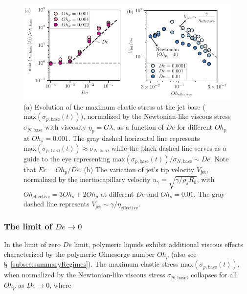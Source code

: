 \documentclass{jfm}
\newcommand{\oo}{\color{magenta} \normalfont}
\newcommand{\bb}{\color{black} \normalfont}
\begin{document}
\begin{figure}
	\centering
	\includegraphics[width=\textwidth]{Figures/Stress_De-r/Stress_De-r_05-eps-converted-to.pdf}
	\caption{(a) Evolution of the maximum elastic stress at the jet base ($\text{max}\left(\sigma_{p,\text{base}}(t)\right)$), normalized by the Newtonian-like viscous stress $\sigma_{N,\text{base}}$ with viscosity $\eta_{p} = G\lambda$, as a function of $De$ for different $Oh_p$ at $Oh_s = 0.001$. The gray dashed horizontal line represents $\text{max}\left(\sigma_{p,\text{base}}(t)\right) \approx \sigma_{N,\text{base}}$ while the black dashed line serves as a guide to the eye representing $\text{max}\left(\sigma_{p,\text{base}}(t)\right)/\sigma_{N,\text{base}} \sim De$. {\oo Note that $Ec = Oh_p/De$. \bb} (b) The variation of jet's tip velocity $V_{\text{jet}}$, normalized by the inertiocapillary velocity $u_\gamma = \sqrt{\gamma/\rho_sR_0}$, with $Oh_{\text{effective}} = 3Oh_s + 2 Oh_p$ at different $De$ and $Oh_s = 0.01$. The gray dashed line represents $V_{\text{jet}} \sim \gamma/\eta_{\text{effective}}$.}
	\label{stressratio_De}
\end{figure}

\subsubsection{The limit of $De \to 0$}

\oo
In the limit of zero $De$ limit, polymeric liquids exhibit additional viscous effects characterized by the polymeric Ohnesorge number $Oh_p$ (also see \S~\ref{subsec:summaryRegimes}).
The maximum elastic stress $\text{max}(\sigma_{p,\text{base}}(t))$, when normalized by the Newtonian-like viscous stress $\sigma_{N,\text{base}}$, collapses for all $Oh_p$ as $De \to 0$, where
\bb
%
\end{document}
